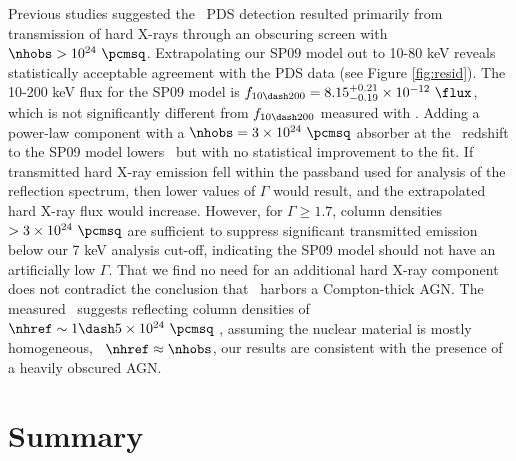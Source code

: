 \documentclass[useAMS,usenatbib]{mn2e}
\begin{document}
Previous studies suggested the \bepposax\ PDS detection resulted
primarily from transmission of hard X-rays through an obscuring screen
with $\nhobs > 10^{24} ~\pcmsq$. Extrapolating our SP09 model out to
10-80 keV reveals statistically acceptable agreement with the PDS data
(see Figure \ref{fig:resid}). The 10-200 keV flux for the SP09 model
is $f_{10 \dash 200} = 8.15^{+0.21}_{-0.19} \times 10^{-12} ~\flux$,
which is not significantly different from $f_{10 \dash 200}$ measured
with \bepposax. Adding a power-law component with a $\nhobs = 3 \times
10^{24} ~\pcmsq$ absorber at the \irs\ redshift to the SP09 model
lowers \chisq\ but with no statistical improvement to the fit. If
transmitted hard X-ray emission fell within the passband used for
analysis of the reflection spectrum, then lower values of $\Gamma$
would result, and the extrapolated hard X-ray flux would
increase. However, for $\Gamma \ge 1.7$, column densities $> 3 \times
10^{24} ~\pcmsq$ are sufficient to suppress significant transmitted
emission below our 7 keV analysis cut-off, indicating the SP09 model
should not have an artificially low $\Gamma$. That we find no need for
an additional hard X-ray component does not contradict the conclusion
that \irs\ harbors a Compton-thick AGN. The measured \fekaew\ suggests
reflecting column densities of $\nhref \sim 1 \dash 5 \times 10^{24}
~\pcmsq$ \citep{1993MNRAS.263..314L, 2005A&A...444..119G}, assuming
the nuclear material is mostly homogeneous, \ie\ $\nhref \approx
\nhobs$, our results are consistent with the presence of a heavily
obscured AGN.

\section{Summary}
\label{sec:summ}
\end{document}
